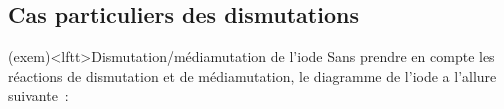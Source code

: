 \documentclass[../../main/main.tex]{subfiles}
\begin{document}
\subsection{Cas particuliers des dismutations}

\begin{tcb*}[sidebyside, sidebyside align=top](exem)<lftt>{Dismutation/médiamutation de l'iode}
	Sans prendre en compte les réactions de dismutation et de médiamutation, le
	diagramme de l'iode a l'allure suivante~:
	\begin{center}
\end{center}
\end{tcb*}
\end{document}
